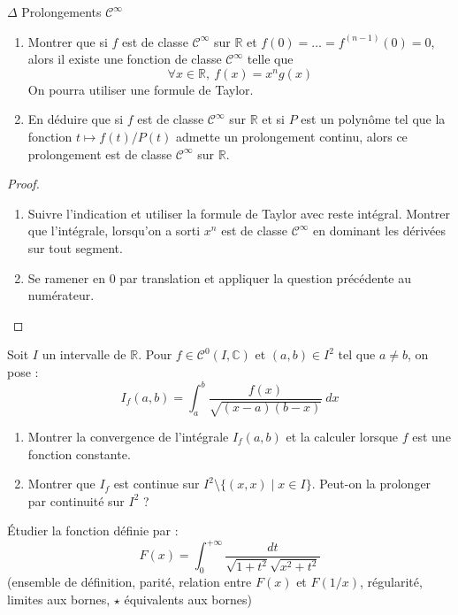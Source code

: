 \documentclass[french,a4paper]{article}
\newcommand{\R}{\mathbb{R}}
\newcommand{\C}{\mathbb{C}}
\theoremstyle{plain}
\theoremstyle{definition}
\theoremstyle{remark}
\begin{document}
\begin{ex}[Moulin.IP.20]{$\Delta$ Prolongements $\mathcal{C}^\infty$}
	\begin{enumerate}
		\item Montrer que si $f$ est de classe $\mathcal{C}^\infty$ sur $\R$ et $f(0)=\ldots=f^{(n-1)}(0)=0$, alors il existe une fonction de classe $\mathcal{C}^\infty$ telle que $$\forall x\in\R,\ f(x)=x^ng(x)$$ On pourra utiliser une formule de Taylor.
		\item En déduire que si $f$ est de classe $\mathcal{C}^\infty$ sur $\R$ et si $P$ est un polynôme tel que la fonction $t\mapsto f(t)/P(t)$ admette un prolongement continu, alors ce prolongement est de classe $\mathcal{C}^\infty$ sur $\R$.
	\end{enumerate}
\end{ex}
\begin{proof}
	\begin{enumerate}
		\item Suivre l'indication et utiliser la formule de Taylor avec reste intégral. Montrer que l'intégrale, lorsqu'on a sorti $x^n$ est de classe $\mathcal{C}^\infty$ en dominant les dérivées sur tout segment.
		\item Se ramener en $0$ par translation et appliquer la question précédente au numérateur.
	\end{enumerate}
\end{proof}

\begin{ex}[Moulin.IP.21]{}
	Soit $I$ un intervalle de $\R$. Pour $f\in\mathcal{C}^0(I,\C)$ et $(a,b)\in I^2$ tel que $a\ne b$, on pose : $$I_f(a,b)=\int_{a}^{b}\frac{f(x)}{\sqrt{(x-a)(b-x)}}\ dx$$
	\begin{enumerate}
		\item Montrer la convergence de l'intégrale $I_f(a,b)$ et la calculer lorsque $f$ est une fonction constante.
		\item Montrer que $I_f$ est continue sur $I^2\setminus\{(x,x)\mid x\in I\}$. Peut-on la prolonger par continuité sur $I^2$ ?
	\end{enumerate}
\end{ex}

\begin{ex}[Moulin.IP.22]{}
	Étudier la fonction définie par : $$F(x)=\int_{0}^{+\infty}\frac{dt}{\sqrt{1+t^2}\sqrt{x^2+t^2}}$$ (ensemble de définition, parité, relation entre $F(x)$ et $F(1/x)$, régularité, limites aux bornes, $\star$ équivalents aux bornes)
\end{ex}
\end{document}
